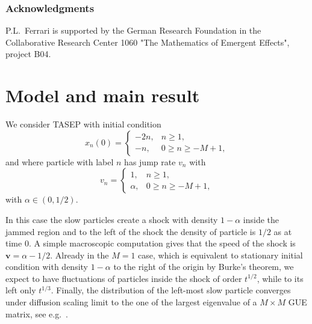 \documentclass[12pt,a4paper]{article}
\numberwithin{equation}{section}
\begin{document}
\subsubsection*{Acknowledgments}
P.L.~Ferrari is supported by the German Research Foundation in the Collaborative Research Center 1060 "The Mathematics of Emergent Effects", project B04.

\section{Model and main result}
We consider TASEP with initial condition
\begin{equation}\label{eqICx}
x_n(0)=
\left\{\begin{array}{ll}
-2n, & n\geq 1,\\
-n,& 0\geq n\geq -M+1,
\end{array}
\right.
\end{equation}
and where particle with label $n$ has jump rate $v_n$ with
\begin{equation}\label{eqICv}
v_n=\left\{\begin{array}{ll}
1, & n\geq 1,\\
\alpha,& 0\geq n\geq -M+1,
\end{array}
\right.
\end{equation}
with $\alpha\in (0,1/2)$.

In this case the slow particles create a shock with density $1-\alpha$ inside the jammed region and to the left of the shock the density of particle is $1/2$ as at time $0$. A simple macroscopic computation gives that the speed of the shock is $\mathbf{v}=\alpha-1/2$. Already in the $M=1$ case, which is equivalent to stationary initial condition with density $1-\alpha$ to the right of the origin by Burke's theorem, we expect to have fluctuations of particles inside the shock of order $t^{1/2}$, while to its left only $t^{1/3}$. Finally, the distribution of the left-most slow particle converges under diffusion scaling limit to the one of the largest eigenvalue of a $M\times M$ GUE matrix, see e.g.~\cite{FF12b,GS12}.
\end{document}
